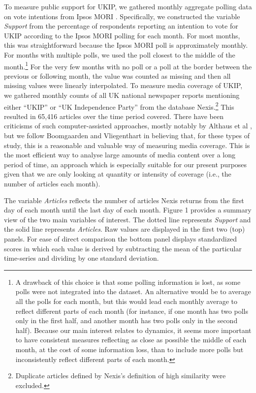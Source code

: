 \documentclass[12pt,]{article}
\begin{document}
To measure public support for UKIP, we gathered monthly aggregate
polling data on vote intentions from Ipsos MORI
\citep{IpsosMORI:gm2fXYNK}. Specifically, we constructed the variable
\emph{Support} from the percentage of respondents reporting an intention
to vote for UKIP according to the Ipsos MORI polling for each month. For
most months, this was straightforward because the Ipsos MORI poll is
approximately monthly. For months with multiple polls, we used the poll
closest to the middle of the
month.\footnote{A drawback of this choice is that some polling information is lost, as some polls were not integrated into the dataset. An alternative would be to average all the polls for each month, but this would lead each monthly average to reflect different parts of each month (for instance, if one month has two polls only in the first half, and another month has two polls only in the second half). Because our main interest relates to dynamics, it seems more important to have consistent measures reflecting as close as possible the middle of each month, at the cost of some information loss, than to include more polls but inconsistently reflect different parts of each month.}
For the very few months with no poll or a poll at the border between the
previous or following month, the value was counted as missing and then
all missing values were linearly interpolated. To measure media coverage
of UKIP, we gathered monthly counts of all UK national newspaper reports
mentioning either ``UKIP'' or ``UK Independence Party'' from the
database
Nexis.\footnote{Duplicate articles defined by Nexis's definition of high similarity were excluded.}
This resulted in 65,416 articles over the time period covered. There
have been criticisms of such computer-assisted approaches, mostly
notably by Althaus et al \citeyearpar{althaus_using_2001}, but we follow
Boomgaarden and Vliegenthart \citeyearpar{Boomgaarden:2007ia} in
believing that, for these types of study, this is a reasonable and
valuable way of measuring media coverage. This is the most efficient way
to analyse large amounts of media content over a long period of time, an
approach which is especially suitable for our present purposes given
that we are only looking at quantity or intensity of coverage (i.e.,
the number of articles each month).

The variable \emph{Articles} reflects the number of articles Nexis
returns from the first day of each month until the last day of each
month. Figure 1 provides a summary view of the two main variables of
interest. The dotted line represents \emph{Support} and the solid line
represents \emph{Articles}. Raw values are displayed in the first two
(top) panels. For ease of direct comparison the bottom panel displays
standardized scores in which each value is derived by subtracting the
mean of the particular time-series and dividing by one standard
deviation.
\end{document}
